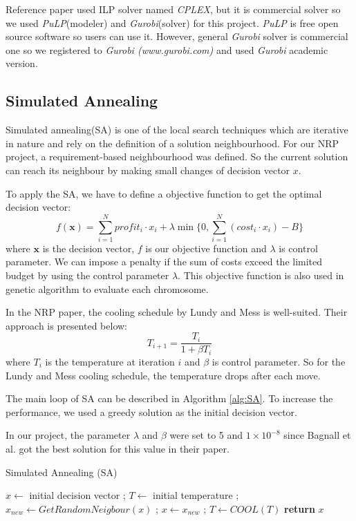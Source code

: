 Reference paper\cite{ILP} used ILP solver named \textit{CPLEX}, but it is commercial solver so we used \textit{PuLP}(modeler) and \textit{Gurobi}(solver) for this project. \textit{PuLP} is free open source software so users can use it. However, general \textit{Gurobi} solver is commercial one so we registered to \textit{Gurobi (www.gurobi.com)} and used \textit{Gurobi} academic version.

\subsection{Simulated Annealing}
Simulated annealing(SA) is one of the local search techniques which are iterative in nature and rely on the definition of a solution neighbourhood. For our NRP project, a requirement-based neighbourhood was defined. So the current solution can reach its neighbour by making small changes of decision vector $x$.

To apply the SA, we have to define a objective function to get the optimal decision vector:
\[
f(\textbf{x}) = \sum_{i = 1}^{N} profit_i \cdot x_i + \lambda \min \Big\{0, \sum_{i = 1}^{N} (cost_i \cdot x_i) - B \Big\}
\]
where $\textbf{x}$ is the decision vector, $f$ is our objective function and $\lambda$ is control parameter. We can impose a penalty if the sum of costs exceed the limited budget by using the control parameter $\lambda$. This objective function is also used in genetic algorithm to evaluate each chromosome.

In the NRP paper\cite{NRP}, the cooling schedule by Lundy and Mess\cite{LundySA} is well-suited. Their approach is presented below:
\[
    T_{i+1} = \frac{T_i}{1 + \beta T_i}
\]
where $T_i$ is the temperature at iteration $i$ and $\beta$ is control parameter. So for the Lundy and Mess cooling schedule, the temperature drops after each move.

The main loop of SA can be described in Algorithm \ref{alg:SA}. To increase the performance, we used a greedy solution as the initial decision vector. 

In our project, the parameter $\lambda$ and $\beta$ were set to 5 and $1 \times 10^{-8}$ since Bagnall et al. got the best solution for this value in their paper.


\begin{algorithm}
\caption{Simulated Annealing (SA)}\label{alg:SA}
\begin{algorithmic}
    \State $x \gets$ initial decision vector ;
    \State $T \gets$ initial temperature ; 
        \State $x_{new} \gets GetRandomNeigbour(x)$ ;
            \State $x \gets x_{new}$ ;
        \EndIf
        \State $T \gets COOL(T)$ 
    \EndWhile
    \textbf{return} $x$
\end{algorithmic}
\end{algorithm}


